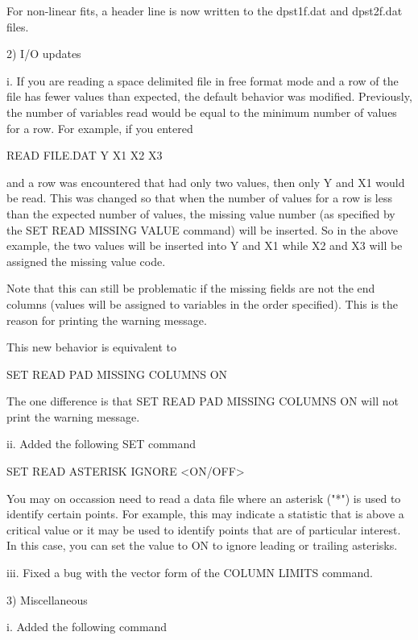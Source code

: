          For non-linear fits, a header line is now written to the dpst1f.dat
         and dpst2f.dat files.

 2) I/O updates

      i. If you are reading a space delimited file in free format mode
         and a row of the file has fewer values than expected, the
         default behavior was modified.  Previously, the number of
         variables read would be equal to the minimum number of values
         for a row.  For example, if you entered

             READ FILE.DAT Y X1 X2 X3

         and a row was encountered that had only two values, then only
         Y and X1 would be read.  This was changed so that when the number
         of values for a row is less than the expected number of values,
         the missing value number (as specified by the SET READ MISSING
         VALUE command) will be inserted.  So in the above example, the
         two values will be inserted into Y and X1 while X2 and X3 will be
         assigned the missing value code.

         Note that this can still be problematic if the missing fields are
         not the end columns (values will be assigned to variables in the
         order specified).  This is the reason for printing the warning
         message.

         This new behavior is equivalent to

              SET READ PAD MISSING COLUMNS ON

         The one difference is that SET READ PAD MISSING COLUMNS ON will
         not print the warning message.

     ii. Added the following SET command

            SET READ ASTERISK IGNORE <ON/OFF>

         You may on occassion need to read a data file where an asterisk
         ("*") is used to identify certain points.  For example, this may
         indicate a statistic that is above a critical value or it may
         be used to identify points that are of particular interest.  In
         this case, you can set the value to ON to ignore leading or
         trailing asterisks.

    iii. Fixed a bug with the vector form of the COLUMN LIMITS command.

 3) Miscellaneous

      i. Added the following command

